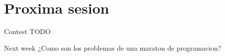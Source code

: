 \documentclass{beamer}
\begin{document}
\section{Proxima sesion}
\begin{frame}{Contest}
  TODO
\end{frame}

\begin{frame}{Next week}
  \centering 
  \Large
  ¿Como son los problemas de una maraton de programacion?
\end{frame}
\end{document}
